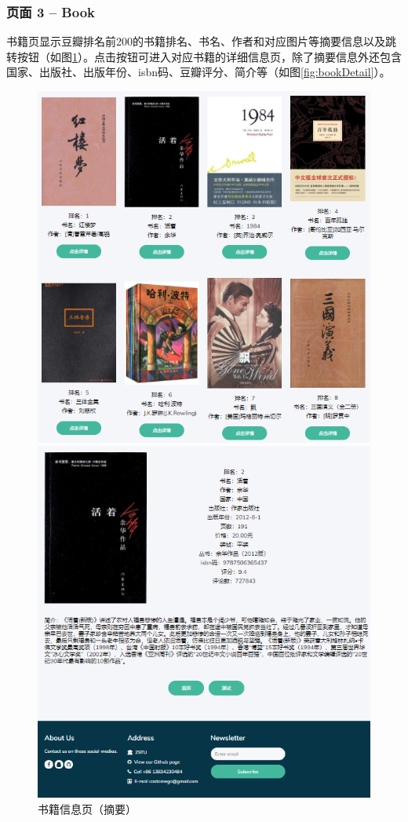 \documentclass[twoside,11pt]{article}
\begin{document}
\subsubsection{页面 3 -- Book}

书籍页显示豆瓣排名前200的书籍排名、书名、作者和对应图片等摘要信息以及跳转按钮（如图\ref{fig:bookBrief}）。点击按钮可进入对应书籍的详细信息页，除了摘要信息外还包含国家、出版社、出版年份、isbn码、豆瓣评分、简介等（如图\ref{fig:bookDetail}）。

\begin{figure}[htbp]
    \begin{minipage}[t]{0.5\linewidth}
        \centering
        \includegraphics[width=0.9\columnwidth]{figures/bookBrief.png}
        \caption{书籍信息页（摘要）}\label{fig:bookBrief}
    \end{minipage}
    \begin{minipage}[t]{0.5\linewidth}
        \centering
        \includegraphics[width=0.9\columnwidth]{figures/bookDetail.png}

\end{minipage}
\end{figure}
\end{document}
